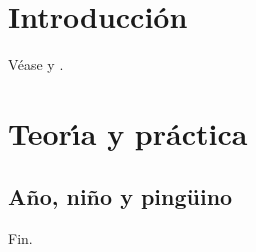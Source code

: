 \documentclass{article}
\begin{document}
\tableofcontents
\section{Introducción}\label{s}
Véase  y .
\section{Teor\'{\i}a y pr\'actica}\label{t}
\subsection{Año, niño y pingüino}
Fin.
\end{document}
